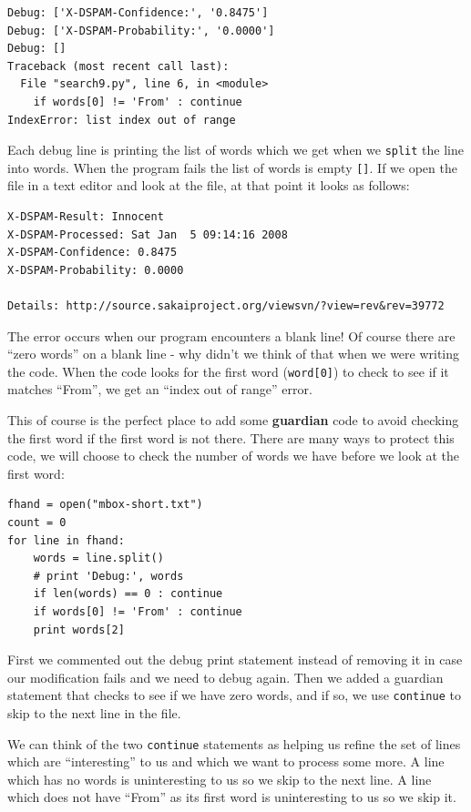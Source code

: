 \documentclass[10pt]{book}
\begin{document}
\beforeverb
\begin{verbatim}
Debug: ['X-DSPAM-Confidence:', '0.8475']
Debug: ['X-DSPAM-Probability:', '0.0000']
Debug: []
Traceback (most recent call last):
  File "search9.py", line 6, in <module>
    if words[0] != 'From' : continue
IndexError: list index out of range
\end{verbatim}
\afterverb
%
Each debug line is printing the list of words which we get
when we {\tt split} the line into words.  When the program fails
the list of words is empty \verb"[]".  If we open the file in a text editor
and look at the file, at that point it looks as follows:

\beforeverb
\begin{verbatim}
X-DSPAM-Result: Innocent
X-DSPAM-Processed: Sat Jan  5 09:14:16 2008
X-DSPAM-Confidence: 0.8475
X-DSPAM-Probability: 0.0000

Details: http://source.sakaiproject.org/viewsvn/?view=rev&rev=39772
\end{verbatim}
\afterverb
%
The error occurs when our program encounters a blank line! Of course there
are ``zero words'' on a blank line - why didn't we think of that 
when we were writing the code.  When the code looks for the first
word (\verb"word[0]") to check to see if it matches ``From'', 
we get an ``index out of range'' error.

This of course is the perfect place to add some {\bf guardian} code 
to avoid checking the first word if the first word is not there.
There are many ways to protect this code, we will choose to 
check the number of words we have before we look at the first word:

\beforeverb
\begin{verbatim}
fhand = open("mbox-short.txt")
count = 0
for line in fhand:
    words = line.split()
    # print 'Debug:', words
    if len(words) == 0 : continue
    if words[0] != 'From' : continue
    print words[2]
\end{verbatim}
\afterverb
%
First we commented out the debug print statement instead of removing it 
in case our modification fails and we need to debug again.  Then we added
a guardian statement that checks to see if we have zero words, and if so, 
we use {\tt continue} to skip to the next line in the file.

We can think of the two {\tt continue} statements as helping us refine
the set of lines which are ``interesting'' to us and which we want 
to process some more.  A line which has no words is uninteresting to 
us so we skip to the next line.  A line which does not have ``From''
as its first word is uninteresting to us so we skip it.
\end{document}
